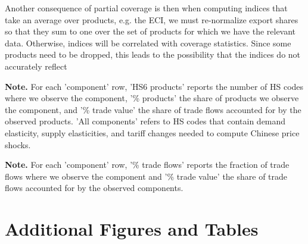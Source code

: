 \documentclass[english,12pt]{article}
\theoremstyle{definition}
\begin{document}
Another consequence of partial coverage is then when computing indices that take an average over products, e.g. the ECI, we must re-normalize export shares so that they sum to one over the set of products for which we have the relevant data. Otherwise, indices will be correlated with coverage statistics. Since some products need to be dropped, this leads to the possibility that the indices do not accurately reflect 

\begin{table}[H]
\begin{centering}
\caption{Product Coverage\label{tab: Coverage}}
\vspace{0.25cm}
\par\end{centering}
\vspace{-0.5cm}
\raggedright{}{\footnotesize{}\textbf{Note.} For each
'component' row, 'HS6 products' reports the number of HS codes where
we observe the component, '\% products' the share of products we observe
the component, and '\% trade value' the share of trade flows accounted
for by the observed products. 'All components' refers to HS codes that contain demand elasticity, supply elasticities, and tariff changes needed to compute Chinese price shocks.}{\footnotesize\par}
\end{table}


\begin{table}[H]
\begin{centering}
\caption{Trade Flow Coverage\label{tab: Coverage Flows}}
\vspace{0.25cm}
\par\end{centering}
\vspace{-0.5cm}
\raggedright{}{\footnotesize{}\textbf{Note.} For each
'component' row, '\% trade flows' reports the fraction of trade flows where
we observe the component and '\% trade value' the share of trade flows accounted
for by the observed components.}{\footnotesize\par}
\end{table}



\section{Additional Figures and Tables \label{app:Figures_Empirics}}
\end{document}
